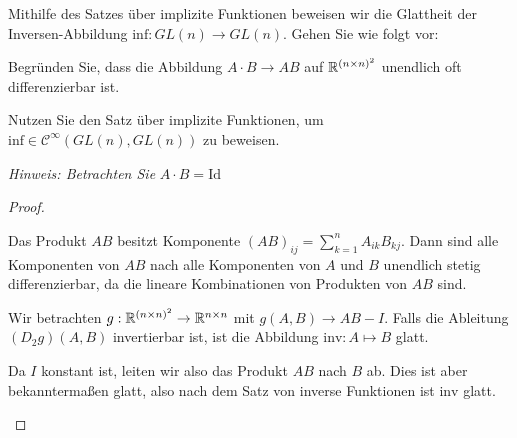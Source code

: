 \begin{Problem}
	Mithilfe des Satzes über implizite Funktionen beweisen wir die Glattheit der Inversen-Abbildung $\text{inf}:GL(n)\to GL(n)$. Gehen Sie wie folgt vor:
	\begin{parts}
	\item Begründen Sie, dass die Abbildung $A\cdot B\to AB$ auf $\mathbb{R}^{(n\times n)^2}$ unendlich oft differenzierbar ist.
	\item Nutzen Sie den Satz über implizite Funktionen, um $\text{inf}\in \mathcal{C}^\infty (GL(n),GL(n))$ zu beweisen.

	\emph{Hinweis: Betrachten Sie} $A\cdot B=\text{Id}$
	\end{parts}
\end{Problem}
\begin{proof}
	\begin{parts}
	\item Das Produkt $AB$ besitzt Komponente $(AB)_{ij}=\sum_{k=1}^n A_{ik}B_{kj}$. Dann sind alle Komponenten von $AB$ nach alle Komponenten von $A$ und $B$ unendlich stetig differenzierbar, da die lineare Kombinationen von Produkten von $AB$ sind.
	\item Wir betrachten $g:\mathbb{R}^{(n\times n)^2}\to \mathbb{R}^{n\times n}$ mit $g(A,B)\to AB-I$. Falls die Ableitung $(D_2g)(A,B)$ invertierbar ist, ist die Abbildung $\text{inv}:A\mapsto B$ glatt. 

		Da $I$ konstant ist, leiten wir also das Produkt $AB$ nach $B$ ab. Dies ist aber bekanntermaßen glatt, also nach dem Satz von inverse Funktionen ist $\text{inv}$ glatt.\qedhere
	\end{parts}
\end{proof}
